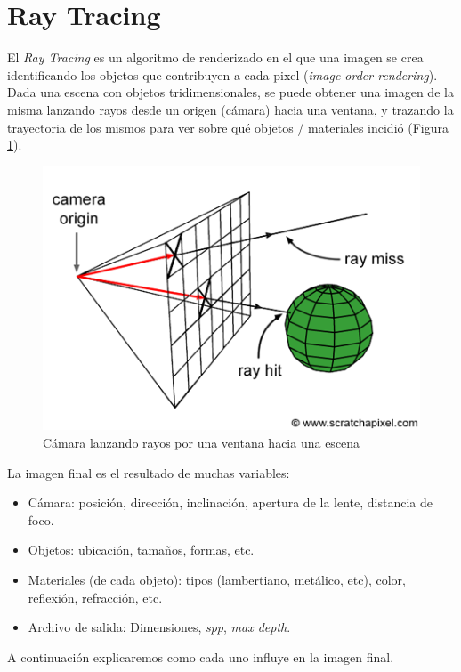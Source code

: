 \section{Ray Tracing} \label{sec:ray-tracing}

El \textit{Ray Tracing} es un algoritmo de renderizado en el que una imagen se
crea identificando los objetos que contribuyen a cada pixel (\textit{image-order
  rendering}). Dada una escena con objetos tridimensionales, se puede obtener una
imagen de la misma lanzando rayos desde un origen (cámara) hacia una ventana, y
trazando la trayectoria de los mismos para ver sobre qué objetos / materiales
incidió (Figura \ref{fig:rt-camera-throwing-rays-into-scene}).

\begin{figure}
  \centering
  \includegraphics[width=.7\textwidth]{imgs/rt-camera-throwing-rays-into-scene.png}
  \caption{Cámara lanzando rayos por una ventana hacia una escena}
  \label{fig:rt-camera-throwing-rays-into-scene}
\end{figure}

La imagen final es el resultado de muchas variables:

\begin{itemize}
  \item Cámara: posición, dirección, inclinación, apertura de la lente,
        distancia de foco.
  \item Objetos: ubicación, tamaños, formas, etc.
  \item Materiales (de cada objeto): tipos (lambertiano, metálico, etc),
        color, reflexión, refracción, etc.
  \item Archivo de salida: Dimensiones, \textit{spp}, \textit{max depth}.
\end{itemize}

A continuación explicaremos como cada uno influye en la imagen final.

